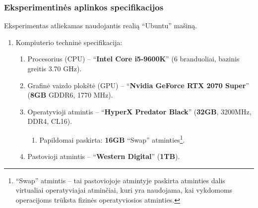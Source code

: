 \documentclass{VUMIFPSbakalaurinis}
\begin{document}
\subsubsection{Eksperimentinės aplinkos specifikacijos}
{
Eksperimentas atliekamas naudojantis realią \enquote{Ubuntu} mašiną.

\begin{enumerate}
	\item Kompiuterio techninė specifikacija:
	\begin{enumerate}
		\item Procesorius (CPU) -- \enquote{\textbf{Intel Core i5-9600K}} (6 branduoliai, bazinis greitis 3.70 GHz).
		\item Grafinė vaizdo plokštė (GPU) -- \enquote{\textbf{Nvidia GeForce RTX 2070 Super}} (\textbf{8GB} GDDR6, 1770 MHz).
		\item Operatyvioji atmintis -- \enquote{\textbf{HyperX Predator Black}} (\textbf{32GB}, 3200MHz, DDR4, CL16).
		\begin{enumerate}
			\item Papildomai paskirta: \textbf{16GB} \enquote{Swap} atminties\footnote{\enquote{Swap} atmintis -- tai pastoviojoje atmintyje paskirta atminties dalis virtualiai operatyviajai atminčiai, kuri yra naudojama, kai vykdomoms operacijoms trūksta fizinės operatyviosios atminties.}.
		\end{enumerate}
		\item Pastovioji atmintis -- \enquote{\textbf{Western Digital}} (\textbf{1TB}).
	\end{enumerate}


\end{enumerate}}
\end{document}
